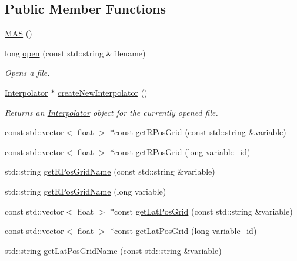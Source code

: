 \subsection*{Public Member Functions}
\begin{DoxyCompactItemize}
\item 
\hyperlink{classccmc_1_1_m_a_s_ad78fa3f4aa33338fae7ec8b3b94a7cc7}{M\-A\-S} ()
\item 
long \hyperlink{classccmc_1_1_m_a_s_a054e168c8a692b724471c0c3c775dc25}{open} (const std\-::string \&filename)
\begin{DoxyCompactList}\small\item\em Opens a file. \end{DoxyCompactList}\item 
\hyperlink{classccmc_1_1_interpolator}{Interpolator} $\ast$ \hyperlink{classccmc_1_1_m_a_s_a31c49cc43cb52378c439be07a81c98b8}{create\-New\-Interpolator} ()
\begin{DoxyCompactList}\small\item\em Returns an \hyperlink{classccmc_1_1_interpolator}{Interpolator} object for the currently opened file. \end{DoxyCompactList}\item 
const std\-::vector$<$ float $>$ $\ast$const \hyperlink{classccmc_1_1_m_a_s_a122e13f77f5d100999b221f4e99969d5}{get\-R\-Pos\-Grid} (const std\-::string \&variable)
\item 
const std\-::vector$<$ float $>$ $\ast$const \hyperlink{classccmc_1_1_m_a_s_a4afe56f686e16528530b7b39d88965da}{get\-R\-Pos\-Grid} (long variable\-\_\-id)
\item 
std\-::string \hyperlink{classccmc_1_1_m_a_s_a12b2234a64300d51e5a7561a6233f7da}{get\-R\-Pos\-Grid\-Name} (const std\-::string \&variable)
\item 
std\-::string \hyperlink{classccmc_1_1_m_a_s_a2602b76e9b24ade052cb12831c79b871}{get\-R\-Pos\-Grid\-Name} (long variable)
\item 
const std\-::vector$<$ float $>$ $\ast$const \hyperlink{classccmc_1_1_m_a_s_a224892d7220189b0d6086bf3ab87759b}{get\-Lat\-Pos\-Grid} (const std\-::string \&variable)
\item 
const std\-::vector$<$ float $>$ $\ast$const \hyperlink{classccmc_1_1_m_a_s_a27e7abd169eb2d87d3f4f9dfe6396791}{get\-Lat\-Pos\-Grid} (long variable\-\_\-id)
\item 
std\-::string \hyperlink{classccmc_1_1_m_a_s_a10aaea12d1d40a1e53ca063027622f35}{get\-Lat\-Pos\-Grid\-Name} (const std\-::string \&variable)
\item 

\end{DoxyCompactItemize}
